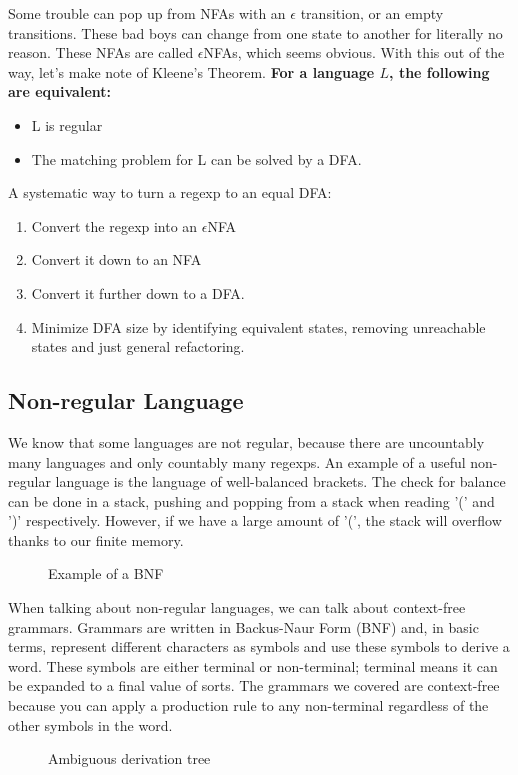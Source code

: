 Some trouble can pop up from NFAs with an $\epsilon$ transition, or an empty transitions. These bad boys can change from one state to another for literally no reason. These NFAs are called $\epsilon$NFAs, which seems obvious. With this out of the way, let's make note of Kleene's Theorem. \textbf{For a language $L$, the following are equivalent:}
\begin{itemize}
	\item L is regular
	\item The matching problem for L can be solved by a DFA.
\end{itemize}

A systematic way to turn a regexp to an equal DFA:
\begin{enumerate}
	\item Convert the regexp into an $\epsilon$NFA
	\item Convert it down to an NFA
	\item Convert it further down to a DFA.
	\item Minimize DFA size by identifying equivalent states, removing unreachable states and just general refactoring.
\end{enumerate}
\subsection{Non-regular Language}
We know that some languages are not regular, because there are uncountably many languages and only countably many regexps. An example of a useful non-regular language is the language of well-balanced brackets. The check for balance can be done in a stack, pushing and popping from a stack when reading '(' and ')' respectively. However, if we have a large amount of '(', the stack will overflow thanks to our finite memory.
\begin{figure}[!htb]
	\caption{\label{fig:dfa} Example of a BNF}
\end{figure}
When talking about non-regular languages, we can talk about context-free grammars. Grammars are written in Backus-Naur Form (BNF) and, in basic terms, represent different characters as symbols and use these symbols to derive a word. These symbols are either terminal or non-terminal; terminal means it can be expanded to a final value of sorts. The grammars we covered are context-free because you can apply a production rule to any non-terminal regardless of the other symbols in the word.
\begin{figure}[!htb]
	\caption{\label{fig:dfa} Ambiguous derivation tree}
\end{figure}
